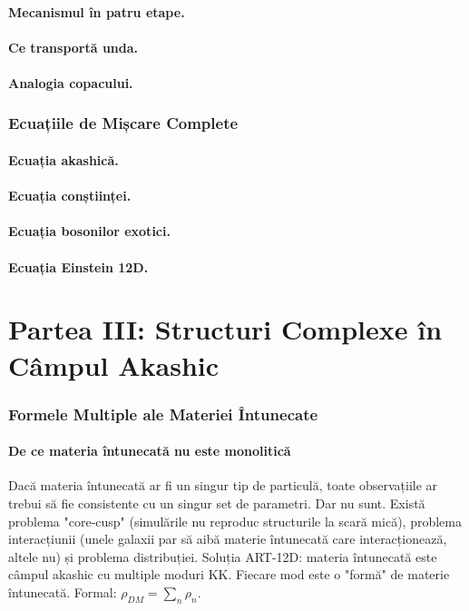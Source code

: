 \documentclass[11pt,a4paper]{article}
\begin{document}
\subsection{Mecanismul în patru etape.}
\subsection{Ce transportă unda.}
\subsection{Analogia copacului.}

\section{Ecuațiile de Mișcare Complete}
\subsection{Ecuația akashică.}
\subsection{Ecuația conștiinței.}
\subsection{Ecuația bosonilor exotici.}
\subsection{Ecuația Einstein 12D.}

\newpage
\part*{Partea III: Structuri Complexe în Câmpul Akashic}

\section{Formele Multiple ale Materiei Întunecate}
\subsection{De ce materia întunecată nu este monolitică}
Dacă materia întunecată ar fi un singur tip de particulă, toate observațiile ar trebui să fie consistente cu un singur set de parametri. Dar nu sunt. Există problema "core-cusp" (simulările nu reproduc structurile la scară mică), problema interacțiunii (unele galaxii par să aibă materie întunecată care interacționează, altele nu) și problema distribuției. Soluția ART-12D: materia întunecată este câmpul akashic cu multiple moduri KK. Fiecare mod este o "formă" de materie întunecată. Formal: $\rho_{DM} = \sum_n \rho_n$.
\end{document}
